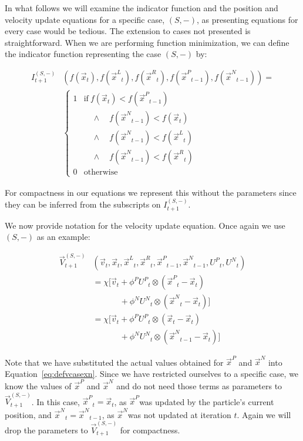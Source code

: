 \documentclass[journal,letterpaper]{IEEEtran}
\providecommand{\pers}{\ensuremath{P}}
\providecommand{\neigh}{\ensuremath{N}}
\providecommand{\leftind}{\ensuremath{L}}
\providecommand{\rightind}{\ensuremath{R}}
\providecommand{\nURand}{\ensuremath{U^\neigh}}
\providecommand{\pURand}{\ensuremath{U^\pers}}
\providecommand{\ppos}{\ensuremath{\Vec{x}}}
\providecommand{\pvel}{\ensuremath{\Vec{v}}}
\providecommand{\nbest}{\ensuremath{\Vec{x}^\neigh}}
\providecommand{\pbest}{\ensuremath{\Vec{x}^\pers}}
\providecommand{\constriction}{\ensuremath{\chi}}
\providecommand{\ncoeff}{\ensuremath{\phi^\neigh}}
\providecommand{\pcoeff}{\ensuremath{\phi^\pers}}
\providecommand{\ofunc}{\ensuremath{f}}
\providecommand{\indic}{\ensuremath{I}}
\providecommand{\specvel}{\ensuremath{\vec{V}}}
\providecommand{\leftn}{\ensuremath{\Vec{x}^\leftind}}
\providecommand{\rightn}{\ensuremath{\Vec{x}^\rightind}}
\providecommand{\casexn}{\ensuremath{(S,-)}}
\begin{document}
In what follows we will examine the indicator function and the position and
velocity update equations for a specific case, $\casexn$, as presenting
equations for every case would be tedious.  The extension to cases not
presented is straightforward.  When we are performing function minimization, we
can define the indicator function representing the case $\casexn$ by:

\begin{align}
  \nonumber
	\indic_{t+1}^{\casexn} & (\ofunc ( \ppos_{t} ) ,\ofunc(\leftn_{t}),
	\ofunc(\rightn_{t}) ,\ofunc(\pbest_{t-1}) ,\ofunc(\nbest_{t-1}))= \\
  \label{eq:deficasexn}
	&\begin{cases}
	   1 & \text{if} \ \ofunc(\ppos_{t}) < \ofunc(\pbest_{t-1}) \\
	   &\quad \wedge \quad \ofunc(\nbest_{t-1}) < \ofunc(\ppos_{t}) \\
	   &\quad \wedge \quad \ofunc(\nbest_{t-1}) < \ofunc(\leftn_{t}) \\
	   &\quad \wedge \quad \ofunc(\nbest_{t-1}) < \ofunc(\rightn_{t}) \\
	   0 & \text{otherwise}
	\end{cases}
\end{align}

For compactness in our equations we represent this without the parameters since
they can be inferred from the subscripts on $\indic_{t+1}^{\casexn}$.

We now provide notation for the velocity update equation.  Once again we use
$\casexn$ as an example:

\begin{align}
\nonumber
	\specvel_{t+1}^{\casexn} & (\pvel_t, \ppos_{t}, \leftn_{t}, \rightn_{t},
	\pbest_{t-1}, \nbest_{t-1}, \pURand_{t}, \nURand_{t}) \\
\nonumber
		&= \constriction \bigl[ \pvel_{t} +
			\pcoeff\pURand_{t}\otimes(\pbest_{t} - \ppos_{t}) \\
\nonumber
		& \quad \quad \quad \; + \ncoeff\nURand_{t}\otimes(\nbest_{t} -
		\ppos_{t}) \bigr] \\
\nonumber
		&= \constriction \bigl[ \pvel_{t} +
			\pcoeff\pURand_{t}\otimes(\ppos_{t} - \ppos_{t}) \\
\label{eq:defvcasexn}
			& \quad \quad \quad \; + \ncoeff\nURand_{t}\otimes(\nbest_{t-1} -
			\ppos_{t}) \bigr]
\end{align}

Note that we have substituted the actual values obtained for $\pbest$ and
$\nbest$ into Equation~\eqref{eq:defvcasexn}.  Since we have restricted
ourselves to a specific case, we know the values of $\pbest$ and $\nbest$ and
do not need those terms as parameters to $\specvel_{t+1}^{\casexn}$.  In this
case, $\pbest_{t}=\ppos_{t}$, as \pbest was updated by the particle's current
position, and $\nbest_{t}=\nbest_{t-1}$, as \nbest was not updated at iteration
$t$.  Again we will drop the parameters to $\specvel_{t+1}^{\casexn}$ for
compactness.
\end{document}
